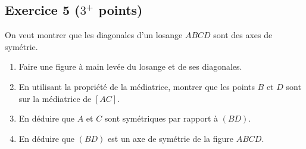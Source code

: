 \documentclass[14 pt]{extarticle}
\theoremstyle{plain}
\begin{document}
\begin{figure}[H]
\end{figure}
 
 \subsection*{Exercice 5 ($3^+$ points)}
 
On veut montrer que les diagonales d'un losange $ABCD$ sont des axes de symétrie. 

\begin{enumerate}
\item Faire une figure à main levée du losange et de ses diagonales. 
\item En utilisant la propriété de la médiatrice, montrer que les points $B$ et $D$ sont sur la médiatrice de $[AC]$. 
\item En déduire que $A$ et $C$ sont symétriques par rapport à $(BD)$. 
\item En déduire que $(BD)$ est un axe de symétrie de la figure $ABCD$. 
\end{enumerate}








 	
\end{document}
